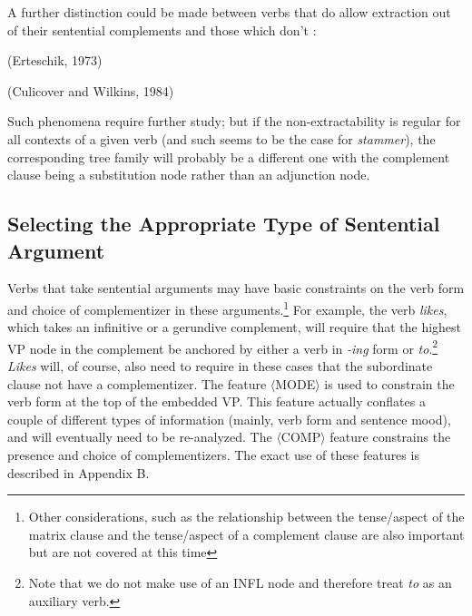 A further distinction could be made between verbs that do allow extraction out of their sentential complements
and those which don't :

\beginsentences
{}
\endsentences

\beginsentences
{}
 (Erteschik, 1973)\nocite{ert71}
\endsentences

\beginsentences
{}
 (Culicover and Wilkins, 1984)\nocite{culicover-wilkins}
\endsentences

Such phenomena require further study; but if the non-extractability is regular for all contexts of a given verb
(and such seems to be the case for {\it stammer}), the corresponding tree family will
probably be a different one  with the complement clause being a substitution node rather than
an adjunction node.

\subsection{Selecting the Appropriate Type of Sentential Argument}

Verbs that take sentential arguments may have basic constraints on the verb form and choice 
of complementizer in these arguments.\footnote{Other considerations, such as the relationship
between the tense/aspect of the matrix clause and the tense/aspect of a complement clause are
also important but are not covered at this time}  For example, the verb {\it likes}, 
which takes an infinitive or a gerundive complement, will require that the highest VP node in 
the complement be anchored by either a verb in {\it -ing} form or 
{\it to}.\footnote{Note that we do not make use of an INFL node and therefore 
treat {\it to} as an auxiliary verb.} {\it Likes} will, of course,  also need to require
in these cases that the subordinate clause not have a complementizer.  The feature $\langle$MODE$\rangle$ 
is used to constrain the verb form at the top of the embedded VP. This feature actually 
conflates a couple of different types of information (mainly, verb form and sentence mood),
and will eventually need to be re-analyzed. The $\langle$COMP$\rangle$ feature constrains the 
presence and choice of complementizers. The exact use of these features is described in 
Appendix B.

